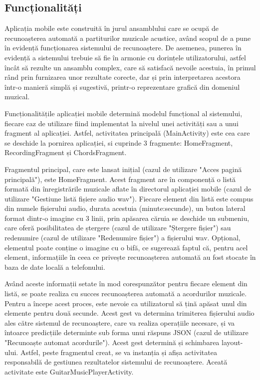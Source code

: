 \documentclass[a4paper,12pt]{report}
\begin{document}
\newpage
\subsection{Funcționalități}
Aplicația mobile este construită în jurul ansamblului care se 
ocupă de recunoașterea automată a partiturilor muzicale acustice,
având scopul de a pune în evidență funcționarea sistemului 
de recunoaștere. De asemenea, punerea în evidență a sistemului 
trebuie să fie în armonie cu dorințele utilizatorului, astfel încât 
să rezulte un ansamblu complex, care să satisfacă nevoile acestuia, 
în primul rând prin furnizarea unor rezultate corecte, dar și prin
interpretarea acestora într-o manieră simplă și sugestivă, printr-o 
reprezentare grafică din domeniul muzical.

Funcționalitățile aplicației mobile determină modelul 
funcțional al sistemului, fiecare caz de utilizare 
fiind implementat la nivelul unei activități sau a unui
fragment al aplicației. Astfel, activitatea principală 
(MainActivity) este cea care se deschide la pornirea aplicației,
si cuprinde 3 fragmente: HomeFragment, RecordingFragment și 
ChordsFragment. 

Fragmentul principal, care este lansat inițial 
(cazul de utilizare "Acces pagină principală"), este
HomeFragment. Acest fragment are în componență o listă formată 
din înregistrările muzicale aflate în directorul aplicației 
mobile (cazul de utilizare "Gestiune listă fișiere audio wav").
Fiecare element din listă este compus din numele fișierului 
audio, durata acestuia (minute:secunde), un buton lateral 
format dintr-o imagine cu 3 linii, prin apăsarea căruia se 
deschide un submeniu, care oferă posibilitatea de ștergere 
(cazul de utilizare "Ștergere fișier") sau redenumire 
(cazul de utilizare "Redenumire fișier") a fișierului wav.
Opțional, elementul poate conține o imagine cu o bifă, ce sugerează 
faptul că, pentru acel element, informațiile în ceea 
ce privește recunoașterea automată au fost stocate 
în baza de date locală a telefonului.

Având aceste informații setate în mod corespunzător pentru 
fiecare element din listă, se poate realiza cu succes 
recunoașterea automată a acordurilor muzicale. Pentru 
a începe acest proces, este nevoie ca utilizatorul 
să țină apăsat unul din elemente pentru două secunde. 
Acest gest va determina trimiterea fișierului audio ales
către sistemul de recunoaștere, care va realiza operațiile 
necesare, și va întoarce predicțiile determinte sub 
forma unui răspuns JSON (cazul de utilizare "Recunoaște 
automat acordurile"). Acest gest determină și 
schimbarea layout-ului. Astfel, peste fragmentul 
creat, se va instanția și afișa activitatea responsabilă 
de gestiunea rezultatelor sistemului de recunoaștere.
Aceată activitate este GuitarMusicPlayerActivity.
\end{document}
